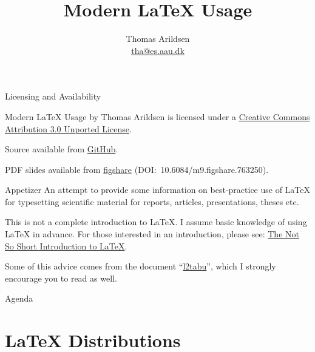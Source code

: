 \documentclass[english]{beamer}
\title{Modern \LaTeX{} Usage}
\author[Thomas Arildsen]
{
  Thomas Arildsen\\
  \href{mailto:tha@es.aau.dk}{{\ttfamily tha@es.aau.dk}}\\
  \ccby
}
\institute[TPS, Dept. of Electronic Systems, Aalborg University]
{ TPS\\
  Dept. of Electronic Systems\\
  Aalborg University}
\date{}
\begin{document}
\begin{frame}[plain]
  \titlepage
\end{frame}

\begin{frame}{Licensing and Availability}
  \begin{block}{}
    Modern LaTeX Usage by Thomas Arildsen is licensed under a
    \href{http://creativecommons.org/licenses/by/3.0/}{Creative
      Commons Attribution 3.0 Unported License}.
    \begin{center}
      \ccby
    \end{center}
  \end{block}
  \begin{block}{}
    Source available from
    \href{https://github.com/ThomasA/modernLaTeX}{GitHub}.
  \end{block}
  \begin{block}{}
    PDF slides available from
    \href{http://dx.doi.org/10.6084/m9.figshare.763250}{figshare}
    (\mbox{DOI: 10.6084/m9.figshare.763250}).
  \end{block}
\end{frame}

\begin{frame}{Appetizer}
  An attempt to provide some information on best-practice use of LaTeX
  for typesetting scientific material for reports, articles,
  presentations, theses etc.

  This is not a complete introduction to \LaTeX. I assume basic
  knowledge of using \LaTeX{} in advance. For those interested in an
  introduction, please see:
  \href{ftp://ftp.dante.de/tex-archive/info/lshort/english/lshort.pdf}{The
    Not So Short Introduction to \LaTeX}.

  Some of this advice comes from the document
  ``\href{ftp://ftp.dante.de/tex-archive/info/l2tabu/english/l2tabuen.pdf}{l2tabu}'',
  which I strongly encourage you to read as well.
\end{frame}

\begin{frame}{Agenda}
  \tableofcontents
\end{frame}


\section{\LaTeX{} Distributions}
\end{document}
